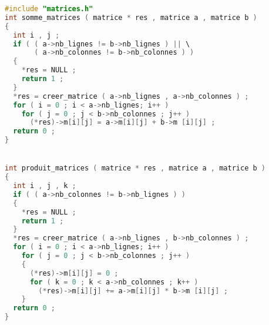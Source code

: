 \begin{solutioncachee}
  \begin{lstlisting}[language=C]
#include "matrices.h"
int somme_matrices ( matrice * res , matrice a , matrice b )
{
  int i , j ;
  if ( ( a->nb_lignes != b->nb_lignes ) || \
       ( a->nb_colonnes != b->nb_colonnes ) )
  {
    *res = NULL ;
    return 1 ;
  }
  *res = creer_matrice ( a->nb_lignes , a->nb_colonnes ) ;
  for ( i = 0 ; i < a->nb_lignes; i++ )
    for ( j = 0 ; j < b->nb_colonnes ; j++ )
      (*res)->m[i][j] = a->m[i][j] + b->m [i][j] ;
  return 0 ;
}


int produit_matrices ( matrice * res , matrice a , matrice b )
{
  int i , j , k ;
  if ( ( a->nb_colonnes != b->nb_lignes ) )
  {
    *res = NULL ;
    return 1 ;
  }
  *res = creer_matrice ( a->nb_lignes , b->nb_colonnes ) ;
  for ( i = 0 ; i < a->nb_lignes; i++ )
    for ( j = 0 ; j < b->nb_colonnes ; j++ )
    {
      (*res)->m[i][j] = 0 ;
      for ( k = 0 ; k < a->nb_colonnes ; k++ )
        (*res)->m[i][j] += a->m[i][j] * b->m [i][j] ;
    }
  return 0 ;
}
  \end{lstlisting}
\end{solutioncachee}